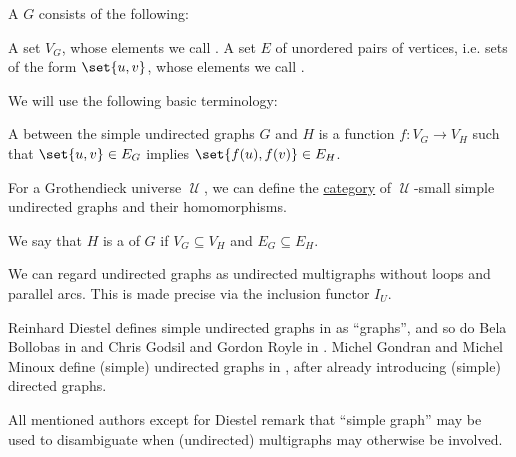 \begin{definition}\label{def:undirected_graph}
  A  \( G \) consists of the following:
  \begin{thmenum}[series=def:undirected_graph]
     A set \( V_G \), whose elements we call .
     A set \( E \) of unordered pairs of  vertices, i.e. sets of the form \( \set{ u, v } \), whose elements we call .
  \end{thmenum}

  We will use the following basic terminology:
  \begin{thmenum}[resume=def:undirected_graph]
     A  between the simple undirected graphs \( G \) and \( H \) is a function \( f: V_G \to V_H \) such that \( \set{ u, v } \in E_G \) implies \( \set{ f(u), f(v) } \in E_H \).

     For a Grothendieck universe \( \mscrU \), we can define the \hyperref[def:category]{category} of \( \mscrU \)-small simple undirected graphs and their homomorphisms.

     We say that \( H \) is a  of \( G \) if \( V_G \subseteq V_H \) and \( E_G \subseteq E_H \).
  \end{thmenum}
\end{definition}
\begin{comments}
  \item We can regard undirected graphs as undirected multigraphs without loops and parallel arcs. This is made precise via the inclusion functor \hyperref[def:graph_functors/undirected_inclusion]{\( I_U \)}.

  \item Reinhard Diestel defines simple undirected graphs in \cite[2]{Diestel2005} as \enquote{graphs}, and so do Bela Bollobas in \cite[1]{Bollobas1998} and Chris Godsil and Gordon Royle in \cite[2]{GodsilRoyle2001}. Michel Gondran and Michel Minoux define (simple) undirected graphs in \cite[3]{GondranMinoux1984Graphs}, after already introducing (simple) directed graphs.

  All mentioned authors except for Diestel remark that \enquote{simple graph} may be used to disambiguate when (undirected) multigraphs may otherwise be involved.
\end{comments}

